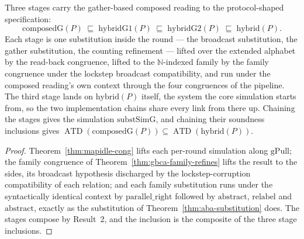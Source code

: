 \begin{theorem}
  \label{thm:aba-substitution-g}
  \leanok
  Three stages carry the gather-based composed reading to the protocol-shaped specification:
  \[
    \mathrm{composedG}(P) \;\sqsubseteq\; \mathrm{hybridG1}(P) \;\sqsubseteq\; \mathrm{hybridG2}(P) \;\sqsubseteq\; \mathrm{hybrid}(P).
  \]
  Each stage is one substitution inside the round --- the broadcast substitution, the gather substitution, the counting refinement --- lifted over the extended alphabet by the read-back congruence, lifted to the $\mathbb{N}$-indexed family by the family congruence under the lockstep broadcast compatibility, and run under the composed reading's own context through the four congruences of the pipeline.
  The third stage lands on $\mathrm{hybrid}(P)$ itself, the system the core simulation starts from, so the two implementation chains share every link from there up.
  Chaining the stages gives the simulation $\mathrm{substSimG}$, and chaining their soundness inclusions gives $\operatorname{ATD}(\mathrm{composedG}(P)) \subseteq \operatorname{ATD}(\mathrm{hybrid}(P))$.
\end{theorem}

\begin{proof}\leanok
  Theorem~\ref{thm:mapidle-cong} lifts each per-round simulation along $\mathrm{gPull}$; the family congruence of Theorem~\ref{thm:gbca-family-refines} lifts the result to the sides, its broadcast hypothesis discharged by the lockstep-corruption compatibility of each relation; and each family substitution runs under the syntactically identical context by $\mathrm{parallel\_right}$ followed by $\mathrm{abstract}$, $\mathrm{relabel}$ and $\mathrm{abstract}$, exactly as the substitution of Theorem~\ref{thm:aba-substitution} does.
  The stages compose by Result~2, and the inclusion is the composite of the three stage inclusions.
\end{proof}
